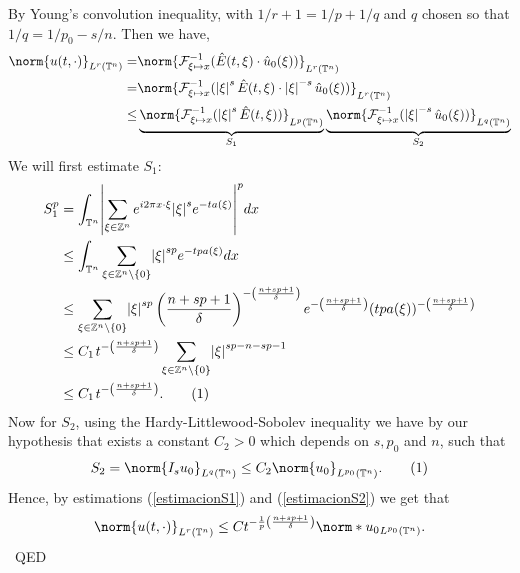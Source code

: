 \documentclass[11pt]{article}
\DeclarePairedDelimiter{\vabs}{\lvert}{\rvert}
\newenvironment{proof}{{\sc Proof:}}{~\hfill QED}
\newcommand{\T}{\mathbb{T}}
\newcommand{\Z}{\mathbb{Z}}
\newcommand\numberthis{\addtocounter{equation}{1}\tag{\theequation}}
\newcommand{\LT}[1]{L^{#1}(\mathbb{T}^n)}
\begin{document}
\begin{proof}
	By Young's convolution inequality, with $1/r + 1 = 1/p + 1/q$ and $q$ chosen so that $1/q = 1/p_0-s/n$. Then we have,
	\begin{align*}
		\norm{u(t,\cdot)}_{\LT{r}} =& \norm{\mathcal{F}_{\xi \mapsto x}^{-1}(\hat{E}(t,\xi)\cdot\hat{u}_0 (\xi))}_{\LT{r}}\\
		=&\norm{\mathcal{F}_{\xi \mapsto x}^{-1}(\left|\xi\right|^{s} \hat{E}(t,\xi)\cdot\left|\xi\right|^{-s}\hat{u}_0 (\xi))}_{\LT{r}}\\
		\le&\underbrace{\norm{\mathcal{F}_{\xi \mapsto x}^{-1}(\left|\xi\right|^{s} \hat{E}(t,\xi))}_{\LT{p}}}_\text{$S_1$}  \underbrace{\norm{\mathcal{F}_{\xi \mapsto x}^{-1}(\left|\xi\right|^{-s}\hat{u}_0 (\xi))}_{\LT{q}}}_\text{$S_2$}
	\end{align*}
	We will first estimate $S_1$:
	\begin{align*}
		S_{1}^p &= \int_{\T^n}\vabs*{\sum_{\xi \in \Z^n} e^{i2\pi x \cdot \xi}\vabs*{\xi}^s e^{-ta(\xi)}}^p dx\\
		&\le \int_{\T^n} \sum_{\xi \in \Z^n \setminus \{0\}} \vabs*{\xi}^{sp} e^{-tpa(\xi)} dx\\
		&\le \sum_{\xi \in \Z^n \setminus \{0\}} \vabs*{\xi}^{sp} \left(\frac{n+sp+1}{\delta}\right)^{-\left(\frac{n+sp+1}{\delta}\right)}e^{-\left(\frac{n+sp+1}{\delta}\right)} (tpa(\xi))^{-\left(\frac{n+sp+1}{\delta}\right)}\\
		&\le C_1 \hspace{1pt}t^{-\left(\frac{n+sp+1}{\delta}\right)}\sum_{\xi \in \Z^n \setminus \{0\}} \vabs*{\xi}^{sp-n-sp-1}\\
		&\le C_1 \hspace{1pt}t^{-\left(\frac{n+sp+1}{\delta}\right)}. \numberthis \label{estimacionS1}
	\end{align*}
	Now for $S_2$, using the Hardy-Littlewood-Sobolev inequality we have by our hypothesis that exists a constant $C_2>0$ which depends on $s,p_0$ and $n$, such that
	\begin{align}
		S_2 = \norm{I_s u_0}_{\LT{q}} \le C_2 \norm{u_0}_{\LT{p_0}}. \numberthis \label{estimacionS2}
	\end{align}
	Hence, by estimations (\ref{estimacionS1}) and (\ref{estimacionS2}) we get that
	\begin{align*}
		\norm{u(t,\cdot)}_{\LT{r}} \le C t^{-\frac{1}{p}\left(\frac{n+sp+1}{\delta}\right)} \norm*{u_0}_{\LT{p_0}}.
	\end{align*}
\end{proof}
\end{document}
